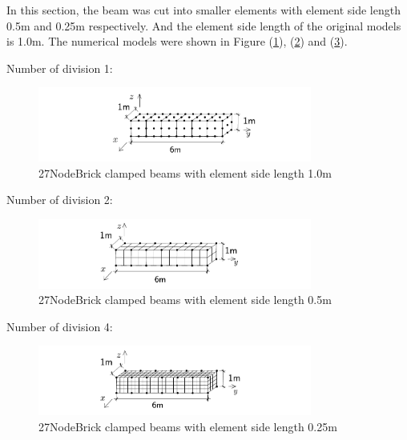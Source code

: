 \documentclass[fleqn,11pt]{article}
\begin{document}
\newpage
In this section, the beam was cut into smaller elements with element side length 0.5m and 0.25m respectively. And the element side length of the original models is 1.0m. The numerical models were shown in Figure (\ref{fig 27NodeBrick clamped beams with element side length 1.0m}), (\ref{fig 27NodeBrick clamped beams with element side length 0.5m}) and (\ref{fig 27NodeBrick clamped beams with element side length 0.25m}). 

Number of division 1:

\begin{figure}[H]
  \centering
  \includegraphics[width=9cm]{../Figure-files/beam_27brick.pdf}
  \caption{27NodeBrick clamped beams with element side length 1.0m}
  \label{fig 27NodeBrick clamped beams with element side length 1.0m}
\end{figure}

Number of division 2:

\begin{figure}[H]
  \centering
  \includegraphics[width=9cm]{../Figure-files/beam_8brick_more_2.pdf}
  \caption{27NodeBrick clamped beams with element side length 0.5m}
  \label{fig 27NodeBrick clamped beams with element side length 0.5m}
\end{figure}

Number of division 4:

\begin{figure}[H]
  \centering
  \includegraphics[width=9cm]{../Figure-files/beam_8brick_more.pdf}
  \caption{27NodeBrick clamped beams with element side length 0.25m}
  \label{fig 27NodeBrick clamped beams with element side length 0.25m}
\end{figure}
\end{document}
